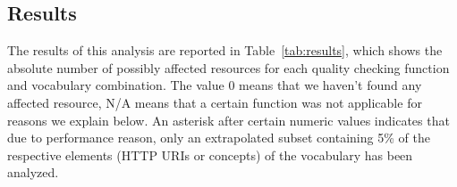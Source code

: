 \begin{table}
\begin{center}
{}
\end{center}
\end{table}

\subsection{Results}

The results of this analysis are reported in Table~\ref{tab:results}, which shows the absolute number of possibly affected resources for each quality checking function and vocabulary combination. The value 0 means that we haven't found any affected resource, N/A means that a certain function was not applicable for reasons we explain below. An asterisk after certain numeric values indicates that due to performance reason, only an extrapolated subset containing 5\% of the respective elements (HTTP URIs or concepts) of the vocabulary has been analyzed.

